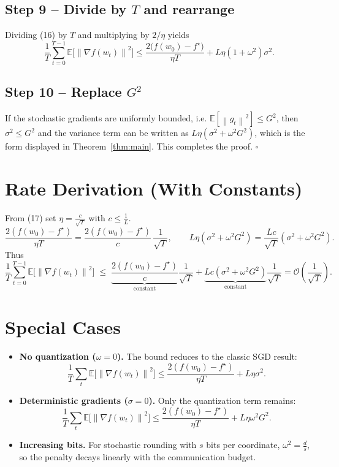 \documentclass{article}
\newcommand{\E}{\mathbb{E}}
\newcommand{\norm}[1]{\left\lVert#1\right\rVert}
\begin{document}
\subsection*{Step 9 – Divide by $T$ and rearrange}
Dividing (16) by $T$ and multiplying by $2/\eta$ yields
\[
\frac{1}{T}\sum_{t=0}^{T-1}\E\!\bigl[\norm{\nabla f(w_{t})}^{2}\bigr]
\le
\frac{2\bigl(f(w_{0})-f^{\star}\bigr)}{\eta T}
+ L\eta(1+\omega^{2})\sigma^{2}. \tag{17}
\]

\subsection*{Step 10 – Replace $G^{2}$}
If the stochastic gradients are uniformly bounded, i.e. $\E[\norm{g_{t}}^{2}]\le G^{2}$, then $\sigma^{2}\le G^{2}$ and the variance term can be written as $L\eta(\sigma^{2}+\omega^{2}G^{2})$, which is the form displayed in Theorem~\ref{thm:main}.  This completes the proof. \hfill $\square$

\section*{Rate Derivation (With Constants)}
From (17) set $\eta = \frac{c}{\sqrt{T}}$ with $c\le\frac{1}{L}$.
\[
\frac{2(f(w_{0})-f^{\star})}{\eta T}
= \frac{2(f(w_{0})-f^{\star})}{c}\,\frac{1}{\sqrt{T}},\qquad
L\eta(\sigma^{2}+\omega^{2}G^{2})
= \frac{Lc}{\sqrt{T}}(\sigma^{2}+\omega^{2}G^{2}).
\]
Thus
\[
\frac{1}{T}\sum_{t=0}^{T-1}\E\!\bigl[\norm{\nabla f(w_{t})}^{2}\bigr]
\;\le\;
\underbrace{\frac{2(f(w_{0})-f^{\star})}{c}}_{\text{constant}}
\frac{1}{\sqrt{T}}
+\underbrace{Lc(\sigma^{2}+\omega^{2}G^{2})}_{\text{constant}}
\frac{1}{\sqrt{T}}
= \mathcal{O}\!\left(\frac{1}{\sqrt{T}}\right).
\]

\section*{Special Cases}
\begin{itemize}
\item \textbf{No quantization ($\omega=0$).}  The bound reduces to the classic SGD result:
\[
\frac{1}{T}\sum_{t}\E\!\bigl[\norm{\nabla f(w_{t})}^{2}\bigr]
\le \frac{2(f(w_{0})-f^{\star})}{\eta T}+L\eta\sigma^{2}.
\]
\item \textbf{Deterministic gradients ($\sigma=0$).}  Only the quantization term remains:
\[
\frac{1}{T}\sum_{t}\E\!\bigl[\norm{\nabla f(w_{t})}^{2}\bigr]
\le \frac{2(f(w_{0})-f^{\star})}{\eta T}+L\eta\omega^{2}G^{2}.
\]
\item \textbf{Increasing bits.}  For stochastic rounding with $s$ bits per coordinate,
$\omega^{2}= \frac{d}{s}$, so the penalty decays linearly with the communication budget.
\end{itemize}
\end{document}
